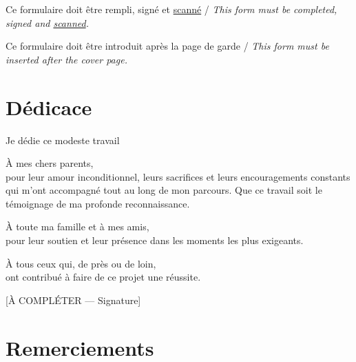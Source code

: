 \documentclass[12pt,a4paper,oneside]{report}
\begin{document}
\vspace{0.8cm}
\noindent\small Ce formulaire doit être rempli, signé et \underline{scanné} /
\emph{This form must be completed, signed and \underline{scanned}.}\par
\noindent\small Ce formulaire doit être introduit après la page de garde /
\emph{This form must be inserted after the cover page.}
\clearpage


\chapter*{Dédicace}
\thispagestyle{empty}
\begin{center}
\itshape
\vspace{2cm}

Je dédie ce modeste travail

\vspace{1cm}

À mes chers parents,\\
pour leur amour inconditionnel, leurs sacrifices et leurs encouragements
constants qui m'ont accompagné tout au long de mon parcours.
Que ce travail soit le témoignage de ma profonde reconnaissance.

\vspace{1cm}

À toute ma famille et à mes amis,\\
pour leur soutien et leur présence dans les moments les plus exigeants.

\vspace{1cm}

À tous ceux qui, de près ou de loin,\\
ont contribué à faire de ce projet une réussite.

\vspace{2cm}

[À COMPLÉTER — Signature]
\end{center}

\chapter*{Remerciements}
\thispagestyle{empty}
\end{document}
